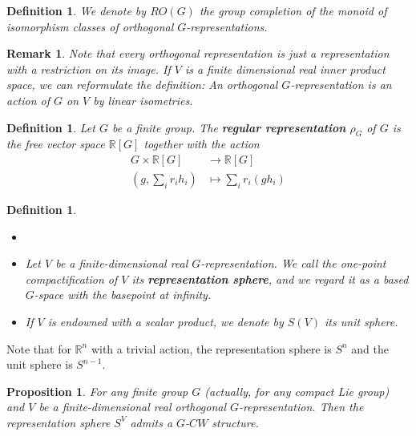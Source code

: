 \documentclass{scrartcl}
\newcommand{\textbi}[1]{\textbf{\textit{#1}}}
\newcommand{\bR}{\mathbb{R}}
\newtheorem{defin}[subsection]{Definition}
\newtheorem{prop}[subsection]{Proposition}
\newtheorem{rem}[subsection]{Remark}
\begin{document}
\begin{defin}
    We denote by $RO(G)$ the group completion of the monoid of isomorphism classes of orthogonal $G$-representations.
\end{defin}

\begin{rem}
    Note that every orthogonal representation is just a representation with a restriction on its image. If $V$ is a finite dimensional real inner product space, we can reformulate the definition: An orthogonal $G$-representation is an action of $G$ on $V$ by linear isometries.
\end{rem}

\begin{defin}
    Let $G$ be a finite group. The \textbi{regular representation} $\rho_G$ of $G$ is the free vector space $\bR[G]$ together with the action
    \begin{align*}
        G\times \bR[G]&\to \bR[G] \\
        (g, \sum_ir_ih_i)&\mapsto \sum_ir_i(gh_i)
    \end{align*}
\end{defin}

\begin{defin}
\begin{itemize}
    \item[] 
    \item Let $V$ be a finite-dimensional real $G$-representation. We call the one-point compactification of $V$ its \textbi{representation sphere}, and we regard it as a based $G$-space with the basepoint at infinity.
    \item If $V$ is endowned with a scalar product, we denote by $S(V)$ its unit sphere.
\end{itemize}    
\end{defin} 

Note that for $\bR^n$ with a trivial action, the representation sphere is $S^n$ and the unit sphere is $S^{n-1}$.

\begin{prop}
    For any finite group $G$ (actually, for any compact Lie group) and $V$ be a finite-dimensional real orthogonal $G$-representation. Then the representation sphere $S^V$ admits a $G$-$CW$ structure.
\end{prop} 

\end{document}

